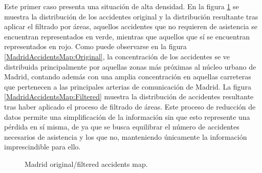\documentclass{uathesis-es}
\begin{document}
{Este primer caso presenta una situación de alta densidad. En la figura \ref{MadridAccidentsMap} se muestra la distribución de los accidentes original y la distribución resultante tras aplicar el filtrado por áreas, aquellos accidentes que no requieren de asistencia se encuentran representados en verde, mientras que aquellos que sí se encuentran representados en rojo. Como puede observarse en la figura \ref{MadridAccidentsMap:Original}, la concentración de los accidentes se ve distribuida principalmente por aquellas zonas más próximas al núcleo urbano de Madrid, contando además con una amplia concentración en aquellas carreteras que pertenecen a las principales arterias de comunicación de Madrid. La figura  \ref{MadridAccidentsMap:Filtered} muestra la distribución de accidentes resultante tras haber aplicado el proceso de filtrado de áreas. Este proceso de reducción de datos permite una simplificación de la información sin que esto represente una pérdida en sí misma, de ya que se busca equilibrar el número de accidentes necesarios de asistencia y los que no, manteniendo únicamente la información imprescindible para ello.

\begin{figure}[H]
    \centering
    \caption{Madrid original/filtered accidents map.}
    \label{MadridAccidentsMap}
\end{figure}

}
\end{document}
